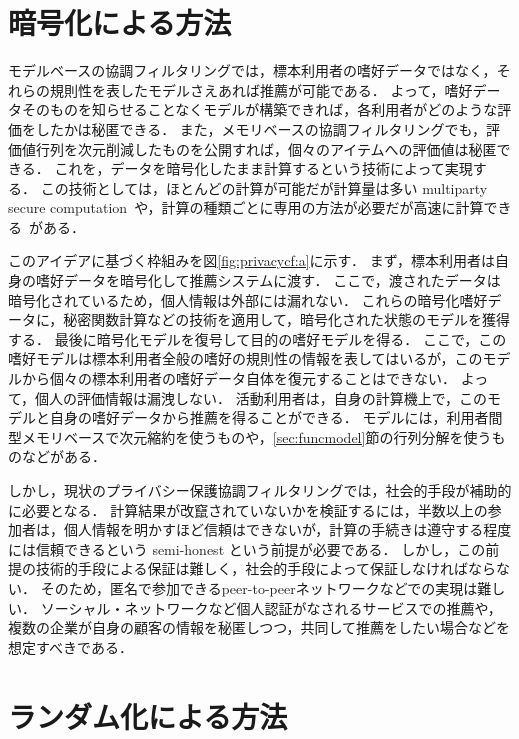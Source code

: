 \section{暗号化による方法}

モデルベースの協調フィルタリングでは，標本利用者の嗜好データではなく，それらの規則性を表したモデルさえあれば推薦が可能である．
よって，嗜好データそのものを知らせることなくモデルが構築できれば，各利用者がどのような評価をしたかは秘匿できる．
また，メモリベースの協調フィルタリングでも，評価値行列を次元削減したものを公開すれば，個々のアイテムへの評価値は秘匿できる．
これを，データを暗号化したまま計算するという技術によって実現する．
この技術としては，ほとんどの計算が可能だが計算量は多い multiparty secure computation~\cite{misc:010}や，計算の種類ごとに専用の方法が必要だが高速に計算できる~\cite{kdde:02:03}がある．

このアイデアに基づく枠組みを図\ref{fig:privacycf:a}に示す．
まず，標本利用者は自身の嗜好データを暗号化して推薦システムに渡す．
ここで，渡されたデータは暗号化されているため，個人情報は外部には漏れない．
これらの暗号化嗜好データに，秘密関数計算などの技術を適用して，暗号化された状態のモデルを獲得する．
最後に暗号化モデルを復号して目的の嗜好モデルを得る．
ここで，この嗜好モデルは標本利用者全般の嗜好の規則性の情報を表してはいるが，このモデルから個々の標本利用者の嗜好データ自体を復元することはできない．
よって，個人の評価情報は漏洩しない．
活動利用者は，自身の計算機上で，このモデルと自身の嗜好データから推薦を得ることができる．
モデルには，利用者間型メモリベースで次元縮約を使うもの\cite{ec:007}や，\ref{sec:funcmodel}節の行列分解を使うもの\cite{sigir:02:01}などがある．

しかし，現状のプライバシー保護協調フィルタリングでは，社会的手段が補助的に必要となる．
計算結果が改竄されていないかを検証するには，半数以上の参加者は，個人情報を明かすほど信頼はできないが，計算の手続きは遵守する程度には信頼できるという semi-honest という前提が必要である．
しかし，この前提の技術的手段による保証は難しく，社会的手段によって保証しなければならない．
そのため，匿名で参加できるpeer-to-peerネットワークなどでの実現は難しい．
ソーシャル・ネットワークなど個人認証がなされるサービスでの推薦や，複数の企業が自身の顧客の情報を秘匿しつつ，共同して推薦をしたい場合などを想定すべきである．

\section{ランダム化による方法}

